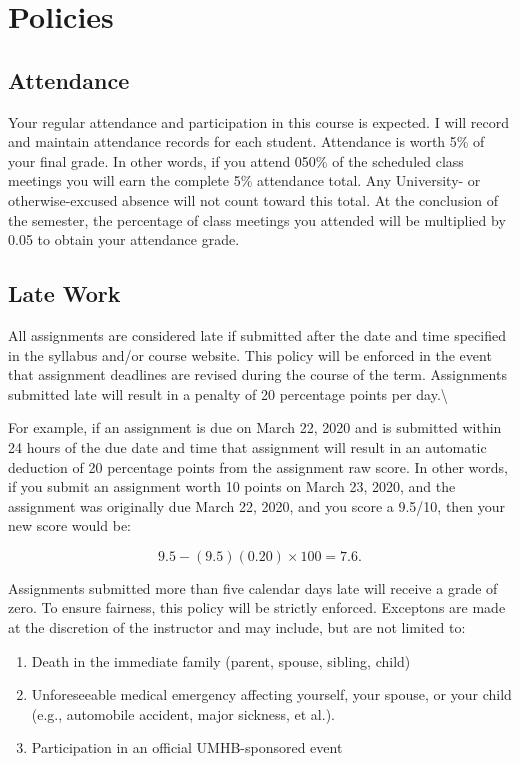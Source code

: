 \documentclass[
]{article}
\providecommand{\tightlist}{%
  \setlength{\itemsep}{0pt}\setlength{\parskip}{0pt}}
\begin{document}
\section{Policies}

\subsection{Attendance}

Your regular attendance and participation in this course is expected. I
will record and maintain attendance records for each student. Attendance
is worth 5\% of your final grade. In other words, if you attend 050\% of
the scheduled class meetings you will earn the complete 5\% attendance
total. Any University- or otherwise-excused absence will not count
toward this total. At the conclusion of the semester, the percentage of
class meetings you attended will be multiplied by 0.05 to obtain your
attendance grade.

\subsection{Late Work}

All assignments are considered late if submitted after the date and time
specified in the syllabus and/or course website. This policy will be
enforced in the event that assignment deadlines are revised during the
course of the term. Assignments submitted late will result in a penalty
of 20 percentage points per day.\textbackslash{}

For example, if an assignment is due on March 22, 2020 and is submitted
within 24 hours of the due date and time that assignment will result in
an automatic deduction of 20 percentage points from the assignment raw
score. In other words, if you submit an assignment worth 10 points on
March 23, 2020, and the assignment was originally due March 22, 2020,
and you score a 9.5/10, then your new score would be:

\begin{equation}
9.5 - (9.5)(0.20) \times 100 = 7.6.
\end{equation}

Assignments submitted more than five calendar days late will receive a
grade of zero. To ensure fairness, this policy will be strictly
enforced. Exceptons are made at the discretion of the instructor and may
include, but are not limited to:

\begin{enumerate}
\def\labelenumi{\arabic{enumi}.}
\tightlist
\item
  Death in the immediate family (parent, spouse, sibling, child)
\item
  Unforeseeable medical emergency affecting yourself, your spouse, or
  your child (e.g., automobile accident, major sickness, et al.).
\item
  Participation in an official UMHB-sponsored event
\end{enumerate}
\end{document}
